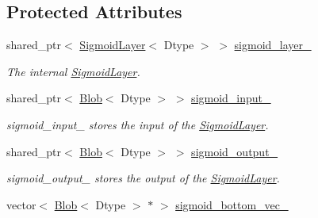 \subsection*{Protected Attributes}
\begin{DoxyCompactItemize}
\item 
\mbox{\label{classcaffe_1_1_swish_layer_ae86bd67afa95fcf3f53d4ffbdfe94222}} 
shared\+\_\+ptr$<$ \mbox{\hyperlink{classcaffe_1_1_sigmoid_layer}{Sigmoid\+Layer}}$<$ Dtype $>$ $>$ \mbox{\hyperlink{classcaffe_1_1_swish_layer_ae86bd67afa95fcf3f53d4ffbdfe94222}{sigmoid\+\_\+layer\+\_\+}}
\begin{DoxyCompactList}\small\item\em The internal \mbox{\hyperlink{classcaffe_1_1_sigmoid_layer}{Sigmoid\+Layer}}. \end{DoxyCompactList}\item 
\mbox{\label{classcaffe_1_1_swish_layer_a7f881eaa4ae3172f57966e22ceae4d74}} 
shared\+\_\+ptr$<$ \mbox{\hyperlink{classcaffe_1_1_blob}{Blob}}$<$ Dtype $>$ $>$ \mbox{\hyperlink{classcaffe_1_1_swish_layer_a7f881eaa4ae3172f57966e22ceae4d74}{sigmoid\+\_\+input\+\_\+}}
\begin{DoxyCompactList}\small\item\em sigmoid\+\_\+input\+\_\+ stores the input of the \mbox{\hyperlink{classcaffe_1_1_sigmoid_layer}{Sigmoid\+Layer}}. \end{DoxyCompactList}\item 
\mbox{\label{classcaffe_1_1_swish_layer_afe86e1e22452f989b2f88cd5be7b0c3e}} 
shared\+\_\+ptr$<$ \mbox{\hyperlink{classcaffe_1_1_blob}{Blob}}$<$ Dtype $>$ $>$ \mbox{\hyperlink{classcaffe_1_1_swish_layer_afe86e1e22452f989b2f88cd5be7b0c3e}{sigmoid\+\_\+output\+\_\+}}
\begin{DoxyCompactList}\small\item\em sigmoid\+\_\+output\+\_\+ stores the output of the \mbox{\hyperlink{classcaffe_1_1_sigmoid_layer}{Sigmoid\+Layer}}. \end{DoxyCompactList}\item 
\mbox{\label{classcaffe_1_1_swish_layer_ac93aea3039bec39fe6a200fde0d17ab1}} 
vector$<$ \mbox{\hyperlink{classcaffe_1_1_blob}{Blob}}$<$ Dtype $>$ $\ast$ $>$ \mbox{\hyperlink{classcaffe_1_1_swish_layer_ac93aea3039bec39fe6a200fde0d17ab1}{sigmoid\+\_\+bottom\+\_\+vec\+\_\+}}

\end{DoxyCompactItemize}
